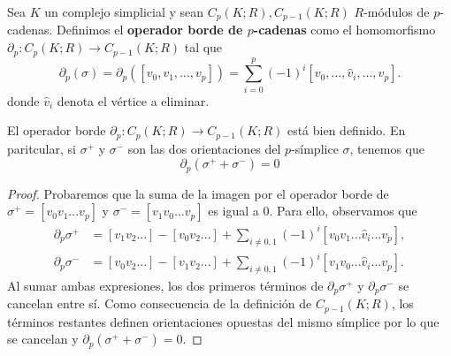 \begin{definicion}
	Sea $K$ un complejo simplicial y sean $C_p(K;R), C_{p-1}(K;R)$ $R$-módulos de $p$-cadenas. Definimos el \textbf{operador borde de $p$-cadenas} como el homomorfismo \(\partial_p : C_p(K;R) \to C_{p-1}(K;R)\) tal que
	\[
		\partial_p(\sigma) = \partial_p([v_0, v_1, \ldots, v_p]) = \sum_{i=0}^{p} (-1)^i[v_0, \ldots, \hat{v}_i, \ldots, v_p] .
	\]
	donde \(\hat{v}_i\) denota el vértice a eliminar.
\end{definicion}
%
\begin{lema}
	El operador borde $\partial_p : C_p(K;R) \to C_{p-1}(K;R)$ está bien definido. En paritcular, si $\sigma^+$ y $\sigma^-$ son las dos orientaciones del $p$-símplice $\sigma$, tenemos que
	\[ \partial_p(\sigma^+ +\sigma^-) = 0 \]
\end{lema}
\begin{proof}
	Probaremos que la suma de la imagen por el operador borde de $\sigma^+ = [v_{0}v_{1}...v_{p}]$ y $\sigma^- = [v_{1}v_{0}...v_{p}]$ es igual a $0$.
	Para ello, observamos que
	\begin{align*}
		\partial_{p}\sigma^+ &= [v_{1}v_{2}...] - [v_{0}v_{2}...] + \sum_{i\ne0,1}(-1)^{i}[v_{0}v_{1}...\hat{v}_{i}...v_{p}],\\
		\partial_{p}\sigma^- &= [v_{0}v_{2}...] - [v_{1}v_{2}...] + \sum_{i\ne0,1}(-1)^{i}[v_{1}v_{0}...\hat{v}_{i}...v_{p}].
	\end{align*}
	Al sumar ambas expresiones, los dos primeros términos de $\partial_{p}\sigma^+$ y $\partial_{p}\sigma^-$ se cancelan entre sí. Como consecuencia de la definición de $C_{p-1}(K;R)$, los términos restantes definen orientaciones opuestas del mismo símplice por lo que se cancelan y $\partial_{p}(\sigma^+ +\sigma^-)=0$.
\end{proof}

